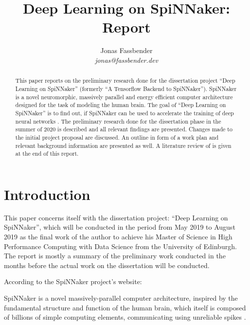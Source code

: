 \documentclass{article}
\begin{document}

\title{Deep Learning on SpiNNaker: Report}
\author{Jonas Fassbender \\ \textit{jonas@fassbender.dev}}
\date{}

\makeEPCCtitle

\newpage

\hspace{0pt}
\vfill

\begin{abstract}
This paper reports on the preliminary research done for the
dissertation project ``Deep Learning on SpiNNaker''
(formerly ``A Tensorflow Backend to SpiNNaker'').
SpiNNaker is a novel neuromorphic, massively parallel and
energy efficient computer architecture designed for the
task of modeling the human brain.
The goal of ``Deep Learning on SpiNNaker'' is to find out,
if SpiNNaker can be used to accelerate the training of
deep neural networks \citep[see e.g.][]{goodfellow2016}.
The preliminary research done for the dissertation phase
in the summer of 2020 is described and all relevant
findings are presented.
Changes made to the initial project proposal are discussed.
An outline in form of a work plan and relevant background
information are presented as well.
A literature review of \citet{nita_2018} is given at the
end of this report.
\end{abstract}

\vfill
\hspace{0pt}

\newpage

\tableofcontents

\newpage


\section{Introduction} %
\label{sec:intro}

This paper concerns itself with the dissertation project:
``Deep Learning on SpiNNaker'', which will be conducted in
the period from May 2019 to August 2019 as the final work
of the author to achieve his Master of Science in
High Performance Computing with Data Science from the
University of Edinburgh.
The report is mostly a summary of the preliminary work
conducted in the months before the actual work on the
dissertation will be conducted.

According to the SpiNNaker project's website:
\begin{displayquote}
  SpiNNaker is a novel massively-parallel computer
  architecture, inspired by the fundamental structure and
  function of the human brain, which itself is composed of
  billions of simple computing elements, communicating
  using unreliable spikes \citep{spinn_proj}.
\end{displayquote}
\end{document}
